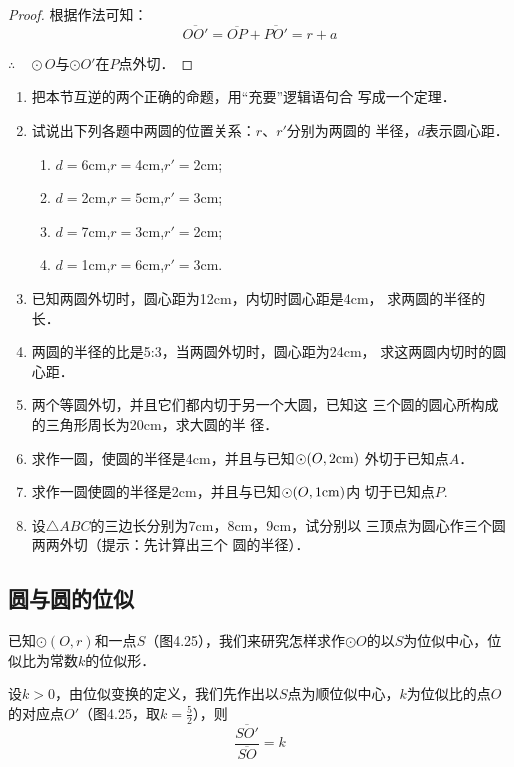 \begin{proof}
  根据作法可知：
\[\overline{OO'}=\overline{OP}+\overline{PO'}=r+a\]

$\therefore\quad \odot O$与$\odot O'$在$P$点外切．
\end{proof}

\begin{ex}
\begin{enumerate}
\item 把本节互逆的两个正确的命题，用“充要”逻辑语句合
写成一个定理．
\item 试说出下列各题中两圆的位置关系：$r$、$r'$分别为两圆的
半径，$d$表示圆心距．
\begin{enumerate}
\item $d=$6cm,\quad $r=$4cm,\quad $r'=$2cm;
\item $d=$2cm,\quad $r=5$cm,\quad $r'=$3cm;
\item $d=$7cm,\quad $r=3$cm,\quad $r'=$2cm;
\item $d=$1cm,\quad $r=6$cm,\quad $ r'=$3cm.
\end{enumerate}

\item 已知两圆外切时，圆心距为12cm，内切时圆心距是4cm，
求两圆的半径的长．
\item 两圆的半径的比是5:3，当两圆外切时，圆心距为24cm，
求这两圆内切时的圆心距．
\item 两个等圆外切，并且它们都内切于另一个大圆，已知这
三个圆的圆心所构成的三角形周长为20cm，求大圆的半
径．
\item 求作一圆，使圆的半径是4cm，并且与已知$\odot (O,2{\rm cm})$
外切于已知点$A$．
\item 求作一圆使圆的半径是2cm，并且与已知$\odot (O,1{\rm cm})$内
切于已知点$P$.
\item 设$\triangle ABC$的三边长分别为7cm，8cm，9cm，试分别以
三顶点为圆心作三个圆两两外切（提示：先计算出三个
圆的半径）．
\end{enumerate}
\end{ex}

\subsection{圆与圆的位似}
已知$\odot (O,r)$和一点$S$（图4.25），我们来研究怎样求作$\odot O$的以$S$为位似中心，位似比为常数$k$的位似形．

设$k>0$，由位似变换的定义，我们先作出以$S$点为顺位似中心，$k$为位似比的点$O$的对应点$O'$（图4.25，取$k=\frac{5}{2}$），则
\[\frac{\overline{SO'}}{\overline{SO}}=k\]
\begin{figure}[htp]
  \centering
{}
  \caption{}
\end{figure}

